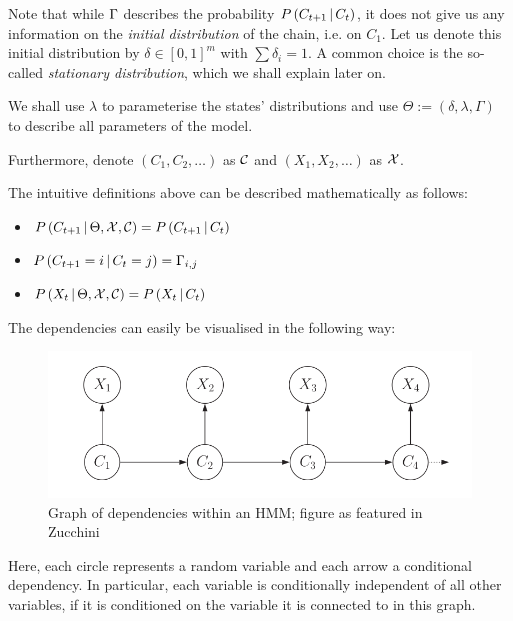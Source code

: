 Note that while $\Gamma$ describes the probability $P\left(C_{t+1} \, | \, C_t\right)$, it does not give us any information on the \textit{initial distribution} of the chain, i.e. on $C_1$. Let us denote this initial distribution by  $\delta \in [0,1]^m$ with $\sum \delta_i = 1$. A common choice is the so-called \textit{stationary distribution}, which we shall explain later on. 

We shall use $\lambda$ to parameterise the states' distributions and use $\Theta := \left(\delta, \lambda, \Gamma \right)$ to describe all parameters of the model.

Furthermore, denote $\left(C_1, C_2, \dots \right)$ as $\mathcal{C}$ and $\left(X_1, X_2, \dots \right)$ as $\mathcal{X}$. 

The intuitive definitions above can be described mathematically as follows:
\begin{itemize}	
	\item $P\left(C_{t+1} \, | \, \Theta, \mathcal{X}, \mathcal{C}\right) = P\left(C_{t+1} \, | \, C_t\right)$
	
	\item $P\left(C_{t+1} = i \, | \, C_t = j\right) = \Gamma_{i, j} $ 
	
	\item $P\left(X_t \, | \,  \Theta, \mathcal{X}, \mathcal{C}\right) = P\left(X_t \, | \, C_t\right)$
\end{itemize}


The dependencies can easily be visualised in the following way:
\begin{figure}[H]
\includegraphics[width=0.8\linewidth]{img/hmm_dependencies.png}
\caption{Graph of dependencies within an HMM; figure as featured in Zucchini}
\end{figure}
Here, each circle represents a random variable and each arrow a conditional dependency. In particular, each variable is conditionally independent of all other variables, if it is conditioned on the variable it is connected to in this graph. 

